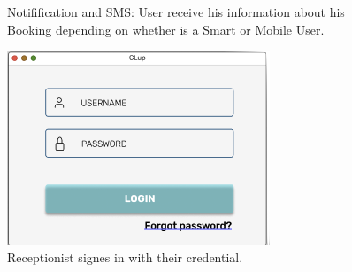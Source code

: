 \begin{figure}[H]
  \caption{Notifification and SMS: User receive his information about his Booking depending on whether is a Smart or Mobile User.}
\end{figure}

\begin{figure}[H]
  \caption{Receptionist signes in with their credential.}
  \label{fig:Login}
  \centering
  \includegraphics[scale=0.55]{images/mockup/LOGIN_REC.png}

\end{figure}

